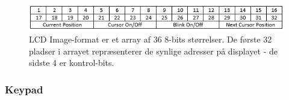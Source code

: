 \begin{figure}[ht]
			\begin{center}
			\includegraphics[scale=0.9]{Billeder/LCD_Array.PNG}
			\end{center}
			\caption{LCD Image-format er et array af 36 8-bits størrelser. De første 32 pladser i arrayet repræsenterer de synlige adresser på displayet - de sidste 4 er kontrol-bits.}
			\label{fig:LCD_array}
\end{figure}

\subsubsection{Keypad}


